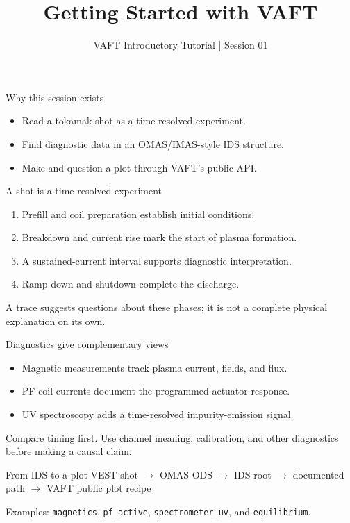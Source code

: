 \documentclass[aspectratio=169]{beamer}
\title{Getting Started with VAFT}
\subtitle{VAFT Introductory Tutorial | Session 01}
\author{}
\date{}
\begin{document}
\begin{frame}
  \titlepage
\end{frame}

\begin{frame}{Why this session exists}
  \begin{itemize}
    \item Read a tokamak shot as a time-resolved experiment.
    \item Find diagnostic data in an OMAS/IMAS-style IDS structure.
    \item Make and question a plot through VAFT's public API.
  \end{itemize}
\end{frame}

\begin{frame}{A shot is a time-resolved experiment}
  \begin{enumerate}
    \item Prefill and coil preparation establish initial conditions.
    \item Breakdown and current rise mark the start of plasma formation.
    \item A sustained-current interval supports diagnostic interpretation.
    \item Ramp-down and shutdown complete the discharge.
  \end{enumerate}
  \vspace{0.5em}
  A trace suggests questions about these phases; it is not a complete physical
  explanation on its own.
\end{frame}

\begin{frame}{Diagnostics give complementary views}
  \begin{itemize}
    \item Magnetic measurements track plasma current, fields, and flux.
    \item PF-coil currents document the programmed actuator response.
    \item UV spectroscopy adds a time-resolved impurity-emission signal.
  \end{itemize}
  \vspace{0.6em}
  Compare timing first. Use channel meaning, calibration, and other diagnostics
  before making a causal claim.
\end{frame}

\begin{frame}{From IDS to a plot}
  \centering
  \Large
  VEST shot \(\rightarrow\) OMAS ODS \(\rightarrow\) IDS root \(\rightarrow\)
  documented path \(\rightarrow\) VAFT public plot recipe
  \vspace{0.7em}

  \normalsize
  Examples: \texttt{magnetics}, \texttt{pf\_active},
  \texttt{spectrometer\_uv}, and \texttt{equilibrium}.
\end{frame}
\end{document}
